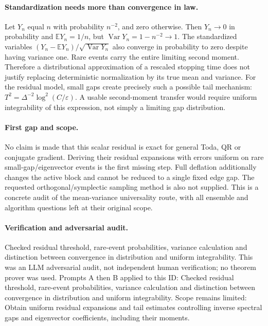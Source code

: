 \documentclass[11pt]{article}
\begin{document}
\paragraph{Standardization needs more than convergence in law.}Let \(Y_n\) equal \(n\) with probability \(n^{-2}\), and zero otherwise. Then \(Y_n\to0\) in probability and \(\mathbb EY_n=1/n\), but \(\operatorname{Var}Y_n=1-n^{-2}\to1\). The standardized variables \((Y_n-\mathbb EY_n)/\sqrt{\operatorname{Var}Y_n}\) also converge in probability to zero despite having variance one. Rare events carry the entire limiting second moment. Therefore a distributional approximation of a rescaled stopping time does not justify replacing deterministic normalization by its true mean and variance.
For the residual model, small gaps create precisely such a possible tail mechanism: \(T^2=\Delta^{-2}\log^2(C/\varepsilon)\). A usable second-moment transfer would require uniform integrability of this expression, not simply a limiting gap distribution.
\paragraph{First gap and scope.}No claim is made that this scalar residual is exact for general Toda, QR or conjugate gradient. Deriving their residual expansions with errors uniform on rare small-gap/eigenvector events is the first missing step. Full deflation additionally changes the active block and cannot be reduced to a single fixed edge gap. The requested orthogonal/symplectic sampling method is also not supplied. This is a concrete audit of the mean-variance universality route, with all ensemble and algorithm questions left at their original scope.

\paragraph{Verification and adversarial audit.}
Checked residual threshold, rare-event probabilities, variance calculation and distinction between convergence in distribution and uniform integrability. This was an LLM adversarial audit, not independent human verification; no theorem prover was used. Prompts A then B applied to this ID: Checked residual threshold, rare-event probabilities, variance calculation and distinction between convergence in distribution and uniform integrability. Scope remains limited: Obtain uniform residual expansions and tail estimates controlling inverse spectral gaps and eigenvector coefficients, including their moments.
\end{document}
